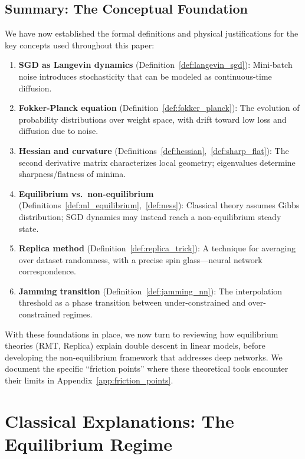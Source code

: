 \documentclass[
  journal=largetwo,
  simfonts=false,
  year=2025,
  volume=37,
]{cup-journal}
\begin{document}
\subsection{Summary: The Conceptual Foundation}

We have now established the formal definitions and physical justifications for the key concepts used throughout this paper:

\begin{enumerate}
    \item \textbf{SGD as Langevin dynamics} (Definition~\ref{def:langevin_sgd}): Mini-batch noise introduces stochasticity that can be modeled as continuous-time diffusion.
    
    \item \textbf{Fokker-Planck equation} (Definition~\ref{def:fokker_planck}): The evolution of probability distributions over weight space, with drift toward low loss and diffusion due to noise.
    
    \item \textbf{Hessian and curvature} (Definitions~\ref{def:hessian},~\ref{def:sharp_flat}): The second derivative matrix characterizes local geometry; eigenvalues determine sharpness/flatness of minima.
    
    \item \textbf{Equilibrium vs.\ non-equilibrium} (Definitions~\ref{def:ml_equilibrium},~\ref{def:ness}): Classical theory assumes Gibbs distribution; SGD dynamics may instead reach a non-equilibrium steady state.
    
    \item \textbf{Replica method} (Definition~\ref{def:replica_trick}): A technique for averaging over dataset randomness, with a precise spin glass---neural network correspondence.
    
    \item \textbf{Jamming transition} (Definition~\ref{def:jamming_nn}): The interpolation threshold as a phase transition between under-constrained and over-constrained regimes.
\end{enumerate}

With these foundations in place, we now turn to reviewing how equilibrium theories (RMT, Replica) explain double descent in linear models, before developing the non-equilibrium framework that addresses deep networks. We document the specific ``friction points'' where these theoretical tools encounter their limits in Appendix~\ref{app:friction_points}.

\section{Classical Explanations: The Equilibrium Regime}
\end{document}
